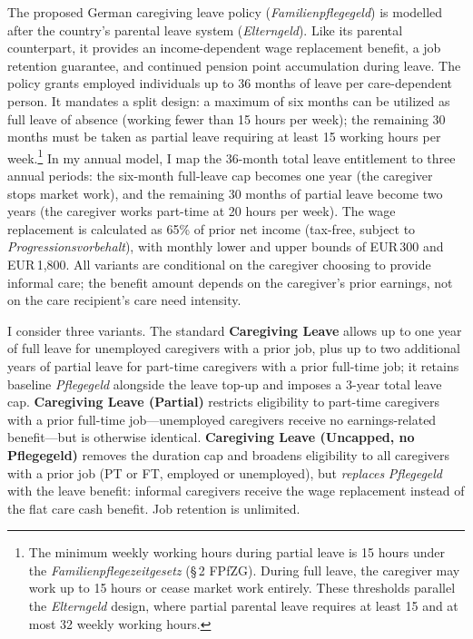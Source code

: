 The proposed German caregiving leave policy (\textit{Familienpflegegeld}) is modelled after the country's parental leave system (\textit{Elterngeld}). Like its parental counterpart, it provides an income-dependent wage replacement benefit, a job retention guarantee, and continued pension point accumulation during leave. The policy grants employed individuals up to 36 months of leave per care-dependent person. It mandates a split design: a maximum of six months can be utilized as full leave of absence (working fewer than 15 hours per week); the remaining 30 months must be taken as partial leave requiring at least 15 working hours per week.\footnote{The minimum weekly working hours during partial leave is 15 hours under the \textit{Familienpflegezeitgesetz} (\S\,2 FPfZG). During full leave, the caregiver may work up to 15 hours or cease market work entirely. These thresholds parallel the \textit{Elterngeld} design, where partial parental leave requires at least 15 and at most 32 weekly working hours.} In my annual model, I map the 36-month total leave entitlement to three annual periods: the six-month full-leave cap becomes one year (the caregiver stops market work), and the remaining 30 months of partial leave become two years (the caregiver works part-time at 20 hours per week). The wage replacement is calculated as 65\% of prior net income (tax-free, subject to \textit{Progressionsvorbehalt}), with monthly lower and upper bounds of EUR\,300 and EUR\,1,800. All variants are conditional on the caregiver choosing to provide informal care; the benefit amount depends on the caregiver's prior earnings, not on the care recipient's care need intensity.

I consider three variants. The standard \textbf{Caregiving Leave} allows up to one year of full leave for unemployed caregivers with a prior job, plus up to two additional years of partial leave for part-time caregivers with a prior full-time job; it retains baseline \textit{Pflegegeld} alongside the leave top-up and imposes a 3-year total leave cap. \textbf{Caregiving Leave (Partial)} restricts eligibility to part-time caregivers with a prior full-time job---unemployed caregivers receive no earnings-related benefit---but is otherwise identical. \textbf{Caregiving Leave (Uncapped, no Pflegegeld)} removes the duration cap and broadens eligibility to all caregivers with a prior job (PT or FT, employed or unemployed), but \textit{replaces} \textit{Pflegegeld} with the leave benefit: informal caregivers receive the wage replacement instead of the flat care cash benefit. Job retention is unlimited.

